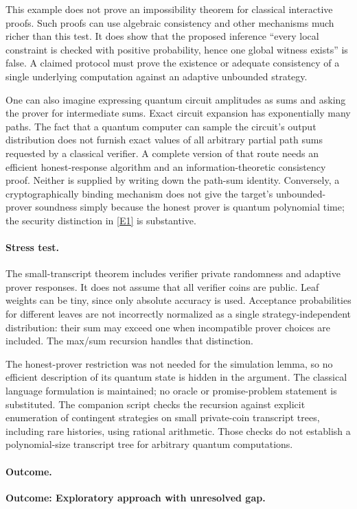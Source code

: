 \documentclass[11pt,a4paper]{article}
\newcommand{\eref}[2]{\hyperlink{extra:#1:#2}{[E#2]}}
\numberwithin{equation}{section}
\begin{document}
This example does not prove an impossibility theorem for classical
interactive proofs.  Such proofs can use algebraic consistency and
other mechanisms much richer than this test.  It does show that the
proposed inference ``every local constraint is checked with positive
probability, hence one global witness exists'' is false.  A claimed
protocol must prove the existence or adequate consistency of a single
underlying computation against an adaptive unbounded strategy.

One can also imagine expressing quantum circuit amplitudes as sums
and asking the prover for intermediate sums.  Exact circuit expansion
has exponentially many paths.  The fact that a quantum computer can
sample the circuit's output distribution does not furnish exact values
of all arbitrary partial path sums requested by a classical verifier.
A complete version of that route needs an efficient honest-response
algorithm and an information-theoretic consistency proof.  Neither
is supplied by writing down the path-sum identity.  Conversely, a
cryptographically binding mechanism does not give the target's
unbounded-prover soundness simply because the honest prover is quantum
polynomial time; the security distinction in \eref{129}{1} is substantive.

\paragraph{Stress test.}
The small-transcript theorem includes verifier private randomness and
adaptive prover responses.  It does not assume that all verifier coins
are public.  Leaf weights can be tiny, since only absolute accuracy is
used.  Acceptance probabilities for different leaves are not incorrectly
normalized as a single strategy-independent distribution: their sum
may exceed one when incompatible prover choices are included.  The
max/sum recursion handles that distinction.

The honest-prover restriction was not needed for the simulation lemma,
so no efficient description of its quantum state is hidden in the
argument.  The classical language formulation is maintained; no
oracle or promise-problem statement is substituted.  The companion
script checks the recursion against explicit enumeration of contingent
strategies on small private-coin transcript trees, including rare
histories, using rational arithmetic.  Those checks do not establish a
polynomial-size transcript tree for arbitrary quantum computations.

\paragraph{Outcome.}
\textbf{Outcome: Exploratory approach with unresolved gap.}
\end{document}
